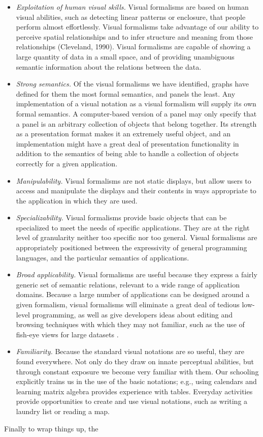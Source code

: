 \documentclass{sig-alternate}
\begin{document}
\begin{itemize}
\item \emph{Exploitation of human visual skills.} Visual formalisms are based
on human visual abilities, such as detecting linear patterns or enclosure,
that people perform almost effortlessly. Visual formalisms take advantage of
our ability to perceive spatial relationships and to infer structure and
meaning from those relationships (Cleveland, 1990). Visual formalisms are
capable of showing a large quantity of data in a small space, and of providing
unambiguous semantic information about the relations between the data. \item
\emph{Strong semantics.} Of the visual formalisms we have identified, graphs
have defined for them the most formal semantics, and panels the least. Any
implementation of a visual notation as a visual formalism will supply its own
formal semantics. A computer-based version of a panel may only specify that a
panel is an arbitrary collection of objects that belong together. Its strength
as a presentation format makes it an extremely useful object, and an
implementation might have a great deal of presentation functionality in
addition to the semantics of being able to handle a collection of objects
correctly for a given application. \item \emph{Manipulability.}  Visual
formalisms are not static displays, but allow users to access and manipulate
the displays and their contents in ways appropriate to the application in
which they are used. \item \emph{Specializability.}  Visual formalisms provide
basic objects that can be specialized to meet the needs of specific
applications. They are at the right level of granularity neither too specific
nor too general. Visual formalisms are appropriately positioned between the
expressivity of general programming languages, and the particular semantics of
applications. \item \emph{Broad applicability.}  Visual formalisms are useful
because they express a fairly generic set of semantic relations, relevant to a
wide range of application domains. Because a large number of applications can
be designed around a given formalism, visual formalisms will eliminate a great
deal of tedious low-level programming, as well as give developers ideas about
editing and browsing techniques with which they may not familiar, such as the
use of fish-eye views for large datasets
\cite{Furnas:1986:GeneralizedFisheyeViews}\cite{Ciccarelli:1990:BrowsingSchematics}.
\item \emph{Familiarity.}
Because the standard visual notations are so useful, they are found
everywhere. Not only do they draw on innate perceptual abilities, but through
constant exposure we become very familiar with them. Our schooling explicitly
trains us in the use of the basic notations; e.g., using calendars and
learning matrix algebra provides experience with tables. Everyday activities
provide opportunities to create and use visual notations, such as writing a
laundry list or reading a map.\end{itemize} Finally to wrap things up, the
\end{document}
